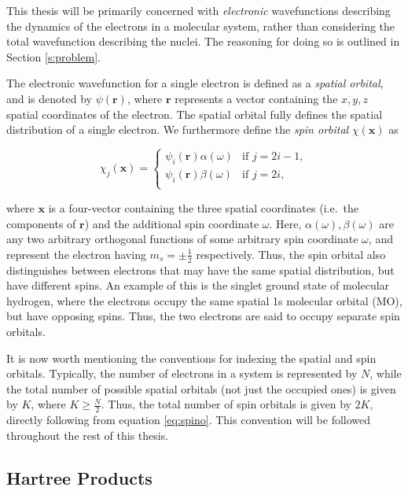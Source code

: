 This thesis will be primarily concerned with \emph{electronic} wavefunctions
describing the dynamics of the electrons in a molecular system, rather than
considering the total wavefunction describing the nuclei. The reasoning for
doing so is outlined in Section \ref{s:problem}.

The electronic wavefunction for a single electron is defined as a \emph{spatial
orbital}, and is denoted by $\psi(\bm r)$, where $\bm r$ represents a vector
containing the $x, y, z$ spatial coordinates of the electron. The spatial
orbital fully defines the spatial distribution of a single electron. We
furthermore define the \emph{spin orbital} $\chi(\bm x)$ as

\begin{equation}
	\chi_{j}(\bm x) =
	\begin{cases}
		\psi_{i}(\bm r) \alpha(\omega)  & \text{if } j = 2i - 1, \\
		\psi_{i}(\bm r) \beta(\omega)   & \text{if } j = 2i, \\
	\end{cases}
	\label{eq:spino}
\end{equation}

\noindent where $\bm x$ is a four-vector containing the three spatial
coordinates (i.e.\ the components of $\bm r$) and the additional spin coordinate
$\omega$. Here, $\alpha(\omega), \beta(\omega)$ are any two arbitrary orthogonal
functions of some arbitrary spin coordinate $\omega$, and represent the electron
having $m_s = \pm \frac{1}{2}$ respectively. Thus, the spin orbital also
distinguishes between electrons that may have the same spatial distribution, but
have different spins. An example of this is the singlet ground state of
molecular hydrogen, where the electrons occupy the same spatial 1s molecular
orbital (MO), but have opposing spins.  Thus, the two electrons are said to
occupy separate spin orbitals.

It is now worth mentioning the conventions for indexing the spatial and spin
orbitals. Typically, the number of electrons in a system is represented by $N$,
while the total number of possible spatial orbitals (not just the occupied ones)
is given by $K$, where $K \geq \frac{N}{2}$. Thus, the total number of spin orbitals is
given by $2K$, directly following from equation \ref{eq:spino}. This convention
will be followed throughout the rest of this thesis.

\subsection{Hartree Products}

